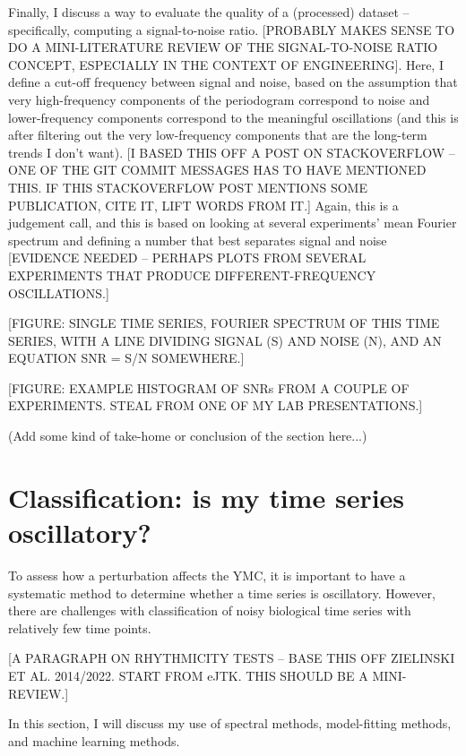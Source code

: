 Finally, I discuss a way to evaluate the quality of a (processed) dataset -- specifically, computing a signal-to-noise ratio.
[PROBABLY MAKES SENSE TO DO A MINI-LITERATURE REVIEW OF THE SIGNAL-TO-NOISE RATIO CONCEPT, ESPECIALLY IN THE CONTEXT OF ENGINEERING].
Here, I define a cut-off frequency between signal and noise, based on the assumption that very high-frequency components of the periodogram correspond to noise and lower-frequency components correspond to the meaningful oscillations (and this is after filtering out the very low-frequency components that are the long-term trends I don't want).
[I BASED THIS OFF A POST ON STACKOVERFLOW -- ONE OF THE GIT COMMIT MESSAGES HAS TO HAVE MENTIONED THIS.  IF THIS STACKOVERFLOW POST MENTIONS SOME PUBLICATION, CITE IT, LIFT WORDS FROM IT.]
Again, this is a judgement call, and this is based on looking at several experiments' mean Fourier spectrum and defining a number that best separates signal and noise [EVIDENCE NEEDED -- PERHAPS PLOTS FROM SEVERAL EXPERIMENTS THAT PRODUCE DIFFERENT-FREQUENCY OSCILLATIONS.]

[FIGURE: SINGLE TIME SERIES, FOURIER SPECTRUM OF THIS TIME SERIES, WITH A LINE DIVIDING SIGNAL (S) AND NOISE (N), AND AN EQUATION SNR = S/N SOMEWHERE.]

[FIGURE: EXAMPLE HISTOGRAM OF SNRs FROM A COUPLE OF EXPERIMENTS.  STEAL FROM ONE OF MY LAB PRESENTATIONS.]

(Add some kind of take-home or conclusion of the section here...)

\section{Classification: is my time series oscillatory?}
\label{sec:analysis-classification}

To assess how a perturbation affects the YMC, it is important to have a systematic method to determine whether a time series is oscillatory.
However, there are challenges with classification of noisy biological time series with relatively few time points.

[A PARAGRAPH ON RHYTHMICITY TESTS -- BASE THIS OFF ZIELINSKI ET AL. 2014/2022.  START FROM eJTK.  THIS SHOULD BE A MINI-REVIEW.]

In this section, I will discuss my use of spectral methods, model-fitting methods, and machine learning methods.



